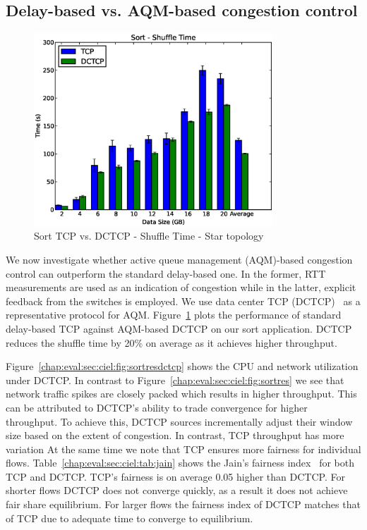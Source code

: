 \documentclass[a4paper,12pt,twoside,openright]{report}
\begin{document}
\subsection{Delay-based vs. AQM-based congestion control}
\begin{figure}[h!]
  \centering
    \includegraphics[width=0.8\textwidth]{shuffle_sort_dctcp.eps}
    \caption{Sort TCP vs. DCTCP - Shuffle Time - Star topology}
    \label{chap:eval:sec:ciel:fig:sortshuffledctcp}
\end{figure}

We now investigate whether active queue management (AQM)-based congestion
control can outperform the standard delay-based one. In the former, RTT
measurements are used as an indication of congestion while in the latter,
explicit feedback from the switches is employed. We use data center TCP
(DCTCP)~\cite{Alizadeh:2010:DCT} as a representative protocol for AQM.
Figure~\ref{chap:eval:sec:ciel:fig:sortshuffledctcp} plots the performance of
standard delay-based TCP against AQM-based DCTCP on our sort application. DCTCP
reduces the shuffle time by 20\% on average as it achieves higher throughput.

Figure~\ref{chap:eval:sec:ciel:fig:sortresdctcp} shows the CPU and network
utilization under DCTCP. In contrast to
Figure~\ref{chap:eval:sec:ciel:fig:sortres} we see that network traffic spikes
are closely packed which results in higher throughput. This can be attributed to
DCTCP's ability to trade convergence for higher throughput. To achieve this,
DCTCP sources incrementally adjust their window size based on the extent of
congestion. In contrast, TCP throughput has more variation  At the same time we
note that TCP ensures more fairness for individual flows.
Table~\ref{chap:eval:sec:ciel:tab:jain} shows the Jain's fairness
index~\cite{Jain:1984:AQM} for both TCP and DCTCP. TCP's fairness is on average
0.05 higher than DCTCP. For shorter flows DCTCP does not converge quickly, as a
result it does not achieve fair share equilibrium. For larger flows the fairness
index of DCTCP matches that of TCP due to adequate time to converge to
equilibrium.
\end{document}
